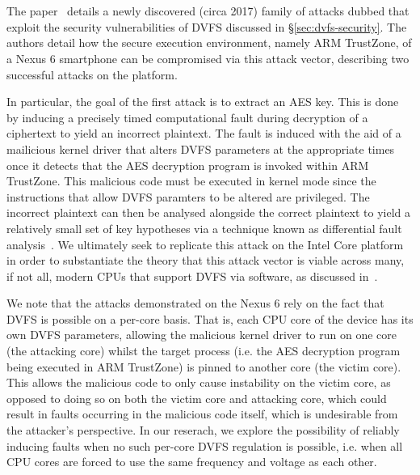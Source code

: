 \section{\clkscrew{}}
\label{sec:clkscrew-review}

The \clkscrew{} paper~\cite{clkscrew} details a newly discovered (circa 2017)
family of attacks dubbed \clkscrew{} that exploit the security vulnerabilities
of DVFS discussed in §\ref{sec:dvfs-security}. The authors detail how the secure
execution environment, namely ARM TrustZone, of a Nexus 6 smartphone can be
compromised via this attack vector, describing two successful attacks on the
platform.

In particular, the goal of the first attack is to extract an AES key. This is
done by inducing a precisely timed computational fault during decryption of a
ciphertext to yield an incorrect plaintext. The fault is induced with the aid of
a mailicious kernel driver that alters DVFS parameters at the appropriate times
once it detects that the AES decryption program is invoked within ARM TrustZone.
This malicious code must be executed in kernel mode since the instructions that
allow DVFS paramters to be altered are privileged. The incorrect plaintext can then be
analysed alongside the correct plaintext to yield a relatively small set of key 
hypotheses via a technique known as differential fault analysis~\cite{tunstallDFA}.
We ultimately seek to replicate this attack on the Intel Core platform in order
to substantiate the theory that this attack vector is viable across many, if not
all, modern CPUs that support DVFS via software, as discussed in~\cite[§6.1]{clkscrew}.

We note that the attacks demonstrated on the Nexus 6 rely on the fact that DVFS
is possible on a per-core basis. That is, each CPU core of the device has its
own DVFS parameters, allowing the malicious kernel driver to run on one core
(the attacking core) whilst the target process (i.e. the AES decryption program
being executed in ARM TrustZone) is pinned to another core (the victim core).
This allows the malicious code to only cause instability on the victim core, as
opposed to doing so on both the victim core and attacking core, which could
result in faults occurring in the malicious code itself, which is undesirable
from the attacker's perspective. In our reserach, we explore the possibility of
reliably inducing faults when no such per-core DVFS regulation is possible,
i.e. when all CPU cores are forced to use the same frequency and voltage as
each other.
